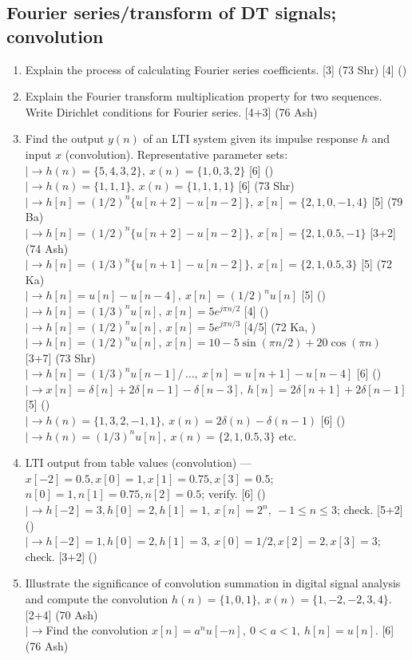 \documentclass[12pt]{article}
\newcommand{\lb}{\\$\left|\rightarrow\right.$}
\begin{document}
  \subsection{Fourier series/transform of DT signals; convolution}
    \begin{enumerate}[topsep=0pt, noitemsep]
      \item Explain the process of calculating Fourier series coefficients. \hfill [3] (73 Shr) [4] ()

      \item Explain the Fourier transform multiplication property for two sequences. Write Dirichlet conditions for Fourier series. \hfill [4+3] (76 Ash)

      \item Find the output $y(n)$ of an LTI system given its impulse response $h$ and input $x$ (convolution). Representative parameter sets:
        \lb $h(n)=\{5,4,3,2\},\ x(n)=\{1,0,3,2\}$ \hfill [6] ()
        \lb $h(n)=\{1,1,1\},\ x(n)=\{1,1,1,1\}$ \hfill [6] (73 Shr)
        \lb $h[n]=(1/2)^n\{u[n+2]-u[n-2]\},\ x[n]=\{2,1,0,-1,4\}$ \hfill [5] (79 Ba)
        \lb $h[n]=(1/2)^n\{u[n+2]-u[n-2]\},\ x[n]=\{2,1,0.5,-1\}$ \hfill [3+2] (74 Ash)
        \lb $h[n]=(1/3)^n\{u[n+1]-u[n-2]\},\ x[n]=\{2,1,0.5,3\}$ \hfill [5] (72 Ka)
        \lb $h[n]=u[n]-u[n-4],\ x[n]=(1/2)^n u[n]$ \hfill [5] ()
        \lb $h[n]=(1/3)^n u[n],\ x[n]=5e^{j\pi n/2}$ \hfill [4] ()
        \lb $h[n]=(1/2)^n u[n],\ x[n]=5e^{j\pi n/3}$ \hfill [4/5] (72 Ka, )
        \lb $h[n]=(1/2)^n u[n],\ x[n]=10-5\sin(\pi n/2)+20\cos(\pi n)$ \hfill [3+7] (73 Shr)
        \lb $h[n]=(1/3)^n u[n-1]/\,\dots,\ x[n]=u[n+1]-u[n-4]$ \hfill [6] ()
        \lb $x[n]=\delta[n]+2\delta[n-1]-\delta[n-3],\ h[n]=2\delta[n+1]+2\delta[n-1]$ \hfill [5] ()
        \lb $h(n)=\{1,3,2,-1,1\},\ x(n)=2\delta(n)-\delta(n-1)$ \hfill [6] ()
        \lb $h(n)=(1/3)^n u[n],\ x(n)=\{2,1,0.5,3\}$ etc.

      \item LTI output from table values (convolution) --- $x[-2]=0.5,x[0]=1,x[1]=0.75,x[3]=0.5$; $n[0]=1,n[1]=0.75,n[2]=0.5$; verify. \hfill [6] ()
        \lb $h[-2]=3,h[0]=2,h[1]=1,\ x[n]=2^n,\ -1\le n\le3$; check. \hfill [5+2] ()
        \lb $h[-2]=1,h[0]=2,h[1]=3,\ x[0]=1/2,x[2]=2,x[3]=3$; check. \hfill [3+2] ()

      \item Illustrate the significance of convolution summation in digital signal analysis and compute the convolution $h(n)=\{1,0,1\},\ x(n)=\{1,-2,-2,3,4\}$. \hfill [2+4] (70 Ash)
        \lb Find the convolution $x[n]=a^n u[-n],\ 0<a<1,\ h[n]=u[n]$. \hfill [6] (76 Ash)
    \end{enumerate}
\end{document}
